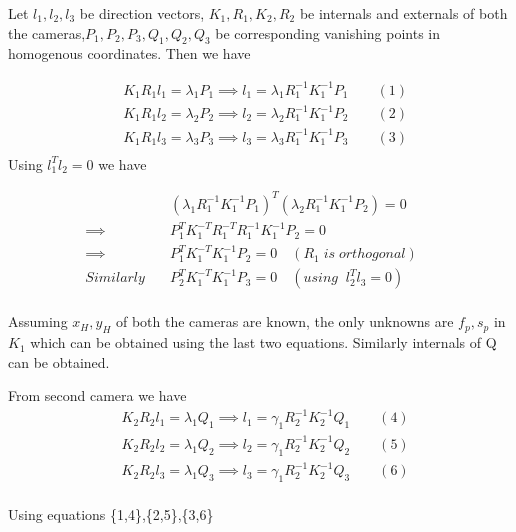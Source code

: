 \documentclass[a4paper]{article}
\begin{document}
Let $l_1,l_2,l_3$ be direction vectors, $K_1,R_1,K_2,R_2$ be internals and externals of both the cameras,$P_1,P_2,P_3,Q_1,Q_2,Q_3$ be corresponding vanishing points  in homogenous coordinates. Then we have 

\begin{equation*}
\begin{split}
& K_1R_1l_1 = \lambda_1 P_1 \implies l_1 = \lambda_1R_1^{-1}K_1^{-1}P_1 \qquad (1)\\
& K_1R_1l_2 = \lambda_2P_2 \implies l_2 = \lambda_2R_1^{-1}K_1^{-1}P_2 \qquad (2)\\
& K_1R_1l_3 = \lambda_3P_3 \implies l_3 = \lambda_3R_1^{-1}K_1^{-1}P_3 \qquad (3)\\
\end{split}
\end{equation*}
Using $l_1^Tl_2^{}=0$ we have

\begin{equation*}
\begin{split}
& (\lambda_1R_1^{-1}K_1^{-1}P_1)^T(\lambda_2R_1^{-1}K_1^{-1}P_2) = 0 \qquad \\
\implies & P_1^{T}K_1^{-T}R_1^{-T}R_1^{-1}K_1^{-1}P_2 = 0\\
\implies & P_1^{T}K_1^{-T}K_1^{-1}P_2 = 0 \quad (R_1\;is \;orthogonal) \\
Similarly \quad &  P_2^{T}K_1^{-T}K_1^{-1}P_3 = 0 \quad (using\;\; l_2^Tl_3^{}=0)\\
\end{split}
\end{equation*}

Assuming $x_H,y_H$ of both the cameras are known, the only unknowns are $f_p,s_p$ in $K_1$ which can be obtained using the last two equations. Similarly internals of Q can be obtained.

From second camera we have 
\begin{equation*}
\begin{split}
& K_2R_2l_1 = \lambda_1 Q_1 \implies l_1 = \gamma_1^{}R_2^{-1}K_2^{-1}Q_1 \qquad (4)\\
& K_2R_2l_2 = \lambda_1 Q_2 \implies l_2 = \gamma_1^{}R_2^{-1}K_2^{-1}Q_2 \qquad (5)\\
& K_2R_2l_3 = \lambda_1 Q_3 \implies l_3 = \gamma_1^{}R_2^{-1}K_2^{-1}Q_3 \qquad (6)\\
\end{split}
\end{equation*}

Using equations \{1,4\},\{2,5\},\{3,6\}  
\end{document}
